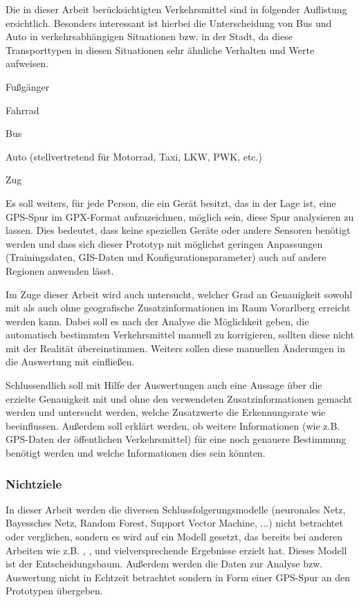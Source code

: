 Die in dieser Arbeit berücksichtigten Verkehrsmittel sind in folgender Auflistung ersichtlich. Besonders interessant ist hierbei die Unterscheidung von Bus und Auto in verkehrsabhängigen Situationen bzw. in der Stadt, da diese Transporttypen in diesen Situationen sehr ähnliche Verhalten und Werte aufweisen. 

\begin{pitemize}
\item Fußgänger
\item Fahrrad
\item Bus
\item Auto (stellvertretend für Motorrad, Taxi, LKW, PWK, etc.)
\item Zug
\end{pitemize}

Es soll weiters, für jede Person, die ein Gerät besitzt, das in der Lage ist, eine GPS-Spur im GPX-Format aufzuzeichnen, möglich sein, diese Spur analysieren zu lassen. Dies bedeutet, dass keine speziellen Geräte oder andere Sensoren benötigt werden und dass sich dieser Prototyp mit möglichst geringen Anpassungen (Trainingsdaten, GIS-Daten und Konfigurationsparameter) auch auf andere Regionen anwenden lässt.

Im Zuge dieser Arbeit wird auch untersucht, welcher Grad an Genauigkeit sowohl mit als auch ohne geografische Zusatzinformationen im Raum Vorarlberg erreicht werden kann. Dabei soll es nach der Analyse die Möglichkeit geben, die automatisch bestimmten Verkehrsmittel manuell zu korrigieren, sollten diese nicht mit der Realität übereinstimmen. Weiters sollen diese manuellen Änderungen in die Auswertung mit einfließen. 

Schlussendlich soll mit Hilfe der Auswertungen auch eine Aussage über die erzielte Genauigkeit mit und ohne den verwendeten Zusatzinformationen gemacht werden und untersucht werden, welche Zusatzwerte die Erkennungsrate wie beeinflussen. Außerdem soll erklärt werden, ob weitere Informationen (wie z.B. GPS-Daten der öffentlichen Verkehrsmittel) für eine noch genauere Bestimmung benötigt werden und welche Informationen dies sein könnten. 

\subsubsection{Nichtziele}

In dieser Arbeit werden die diversen Schlussfolgerungsmodelle (neuronales Netz, Bayessches Netz, Random Forest, Support Vector Machine, ...) nicht betrachtet oder verglichen, sondern es wird auf ein Modell gesetzt, das bereits bei anderen Arbeiten wie z.B. \cite{stenneth_transportation_2011}, \cite{reddy_using_2010}, \cite{sebastian_nagel_moglichkeitsstudie_2011} und  \cite{zheng_learning_2008} vielversprechende Ergebnisse erzielt hat. Dieses Modell ist der Entscheidungsbaum. Außerdem werden die Daten zur Analyse bzw. Auswertung nicht in Echtzeit betrachtet sondern in Form einer GPS-Spur an den Prototypen übergeben.

